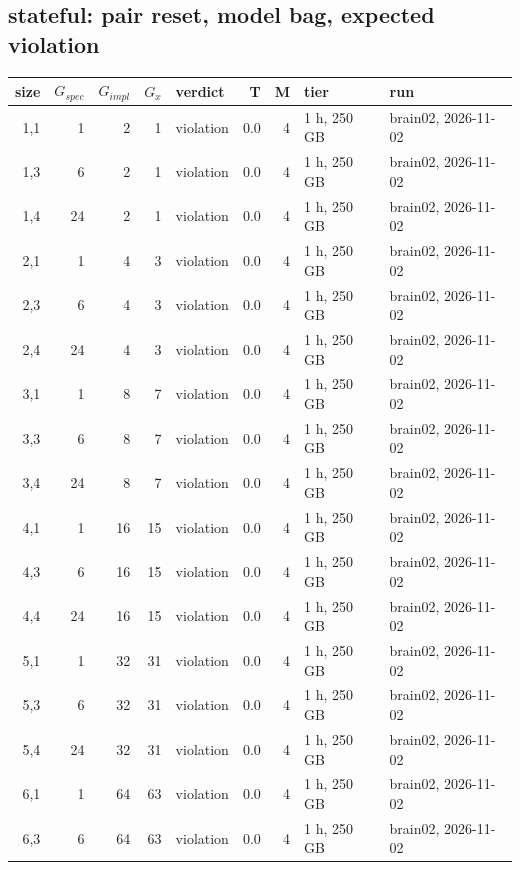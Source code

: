 \documentclass[10pt]{article}
\begin{document}
\subsection*{stateful: pair \textsf{reset}, model bag, expected violation}
\begin{longtable}{@{}rrrrlrrll@{}}
\toprule
size & $G_{\mathit{spec}}$ & $G_{\mathit{impl}}$ & $G_x$ & verdict & T & M & tier & run \\
\midrule
\endhead
\color{blue} 1,1 & 1 & 2 & 1 & violation & 0.0 & 4 & 1 h, 250 GB & brain02, 2026-11-02 \\
\color{blue} 1,3 & 6 & 2 & 1 & violation & 0.0 & 4 & 1 h, 250 GB & brain02, 2026-11-02 \\
\color{blue} 1,4 & 24 & 2 & 1 & violation & 0.0 & 4 & 1 h, 250 GB & brain02, 2026-11-02 \\
\color{blue} 2,1 & 1 & 4 & 3 & violation & 0.0 & 4 & 1 h, 250 GB & brain02, 2026-11-02 \\
\color{blue} 2,3 & 6 & 4 & 3 & violation & 0.0 & 4 & 1 h, 250 GB & brain02, 2026-11-02 \\
\color{blue} 2,4 & 24 & 4 & 3 & violation & 0.0 & 4 & 1 h, 250 GB & brain02, 2026-11-02 \\
\color{blue} 3,1 & 1 & 8 & 7 & violation & 0.0 & 4 & 1 h, 250 GB & brain02, 2026-11-02 \\
\color{blue} 3,3 & 6 & 8 & 7 & violation & 0.0 & 4 & 1 h, 250 GB & brain02, 2026-11-02 \\
\color{blue} 3,4 & 24 & 8 & 7 & violation & 0.0 & 4 & 1 h, 250 GB & brain02, 2026-11-02 \\
\color{blue} 4,1 & 1 & 16 & 15 & violation & 0.0 & 4 & 1 h, 250 GB & brain02, 2026-11-02 \\
\color{blue} 4,3 & 6 & 16 & 15 & violation & 0.0 & 4 & 1 h, 250 GB & brain02, 2026-11-02 \\
\color{blue} 4,4 & 24 & 16 & 15 & violation & 0.0 & 4 & 1 h, 250 GB & brain02, 2026-11-02 \\
\color{blue} 5,1 & 1 & 32 & 31 & violation & 0.0 & 4 & 1 h, 250 GB & brain02, 2026-11-02 \\
\color{blue} 5,3 & 6 & 32 & 31 & violation & 0.0 & 4 & 1 h, 250 GB & brain02, 2026-11-02 \\
\color{blue} 5,4 & 24 & 32 & 31 & violation & 0.0 & 4 & 1 h, 250 GB & brain02, 2026-11-02 \\
\color{blue} 6,1 & 1 & 64 & 63 & violation & 0.0 & 4 & 1 h, 250 GB & brain02, 2026-11-02 \\
\color{blue} 6,3 & 6 & 64 & 63 & violation & 0.0 & 4 & 1 h, 250 GB & brain02, 2026-11-02 \\

\end{longtable}
\end{document}
